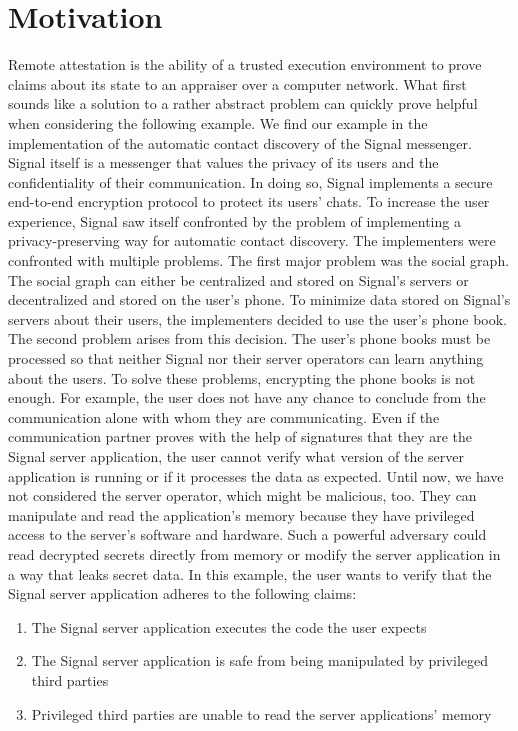 \section{Motivation}
\label{sec:10:motivation}
Remote attestation is the ability of a trusted execution environment to prove claims about its state to an appraiser
over a computer network. \cite{coker_principles_2011} What first sounds like a solution to a rather abstract problem can
quickly prove helpful when considering the following example.
We find our example in the implementation of the automatic contact discovery of the Signal messenger. Signal itself is a
messenger that values the privacy of its users and the confidentiality of their communication. In doing so, Signal
implements a secure end-to-end encryption protocol to protect its users' chats.\cite{cohn2020formal}
To increase the user experience, Signal saw itself confronted by the problem of implementing a privacy-preserving way
for automatic contact discovery.\cite{SignalCd} The implementers were confronted with multiple problems. The first major
problem was the social graph. The social graph can either be centralized and stored on Signal's servers or decentralized
and stored on the user's phone. To minimize data stored on Signal's servers about their users, the implementers decided
to use the user's phone book. The second problem arises from this decision. The user's phone books must be processed so
that neither Signal nor their server operators can learn anything about the users.
To solve these problems, encrypting the phone books is not enough. For example, the user does not have any chance to
conclude from the communication alone with whom they are communicating. Even if the communication partner proves with
the help of signatures that they are the Signal server application, the user cannot verify what version of the server
application is running or if it processes the data as expected. Until now, we have not considered the server operator,
which might be malicious, too. They can manipulate and read the application's memory because they have privileged access
to the server's software and hardware. Such a powerful adversary could read decrypted secrets directly from
memory or modify the server application in a way that leaks secret data.
In this example, the user wants to verify that the Signal server application adheres to the following claims:
\begin{enumerate}
    \item The Signal server application executes the code the user expects
    \item The Signal server application is safe from being manipulated by privileged third parties
    \item Privileged third parties are unable to read the server applications' memory
\end{enumerate}
